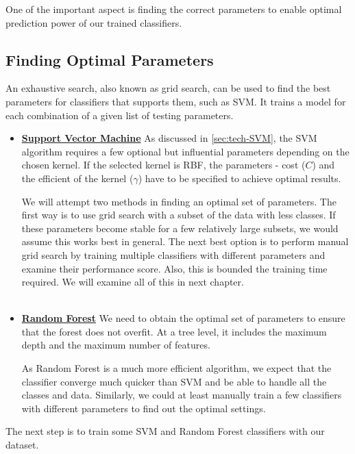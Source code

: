 One of the important aspect is finding the correct parameters to enable optimal prediction power of our trained classifiers.

\subsection{Finding Optimal Parameters}
An exhaustive search, also known as grid search, can be used to find the best parameters for classifiers that supports them, such as SVM. It trains a model for each combination of a given list of testing parameters. 

\begin{itemize}
  \item \textbf{\underline{Support Vector Machine}}
As discussed in \autoref{sec:tech-SVM}, the SVM algorithm requires a few optional but influential parameters depending on the chosen kernel. If the selected kernel is RBF, the parameters - cost ($C$) and the efficient of the kernel ($\gamma$) have to be specified to achieve optimal results. 

We will attempt two methods in finding an optimal set of parameters. The first way is to use grid search with a subset of the data with less classes. If these parameters become stable for a few relatively large subsets, we would assume this works best in general. The next best option is to perform manual grid search by training multiple classifiers with different parameters and examine their performance score. Also, this is bounded the training time required. We will examine all of this in next chapter.\\ \\

  \item \textbf{\underline{Random Forest}}
We need to obtain the optimal set of parameters to ensure that the forest does not overfit. At a tree level, it includes the maximum depth and the maximum number of features.

As Random Forest is a much more efficient algorithm, we expect that the classifier converge much quicker than SVM and be able to handle all the classes and data. Similarly, we could at least manually train a few classifiers with different parameters to find out the optimal settings.
\end{itemize}

The next step is to train some SVM and Random Forest classifiers with our dataset. 
